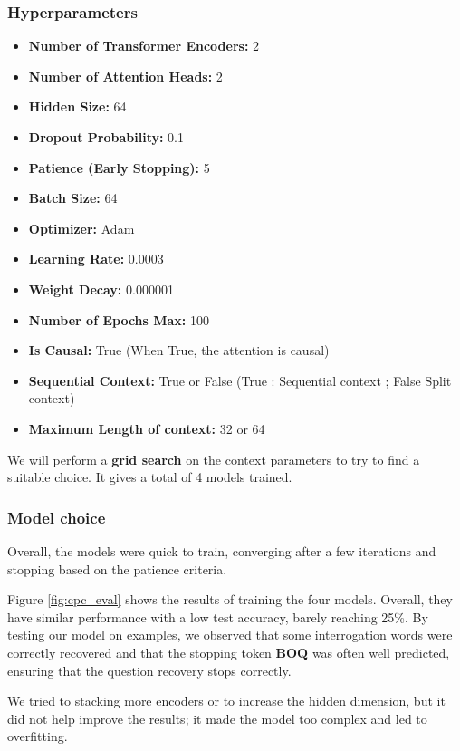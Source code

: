 \documentclass{article}
\begin{document}
\subsubsection{Hyperparameters}\label{cpc_hyperparams}

\begin{itemize}
    \item \textbf{Number of Transformer Encoders:} 2
    \item \textbf{Number of Attention Heads:} 2
    \item \textbf{Hidden Size:} 64
    \item \textbf{Dropout Probability:} 0.1
    \item \textbf{Patience (Early Stopping):} 5
    \item \textbf{Batch Size:} 64
    \item \textbf{Optimizer:} Adam
    \item \textbf{Learning Rate:} 0.0003
    \item \textbf{Weight Decay:} 0.000001
    \item \textbf{Number of Epochs Max:} 100
    \item \textbf{Is Causal:} True (When True, the attention is causal)
    \item \textbf{Sequential Context:} True or False (True : Sequential context ; False Split context)
    \item \textbf{Maximum Length of context:} 32 or 64
\end{itemize}

We will perform a \textbf{grid search} on the context parameters to try to find a suitable choice. It gives a total of 4 models trained.

\subsubsection{Model choice}

Overall, the models were quick to train, converging after a few iterations and stopping based on the patience criteria.

Figure \ref{fig:cpc_eval} shows the results of training the four models. Overall, they have similar performance with a low test accuracy, barely reaching 25\%. By testing our model on examples, we observed that some interrogation words were correctly recovered and that the stopping token \textbf{BOQ} was often well predicted, ensuring that the question recovery stops correctly.

We tried to stacking more encoders or to increase the hidden dimension, but it did not help improve the results; it made the model too complex and led to overfitting.
\end{document}
